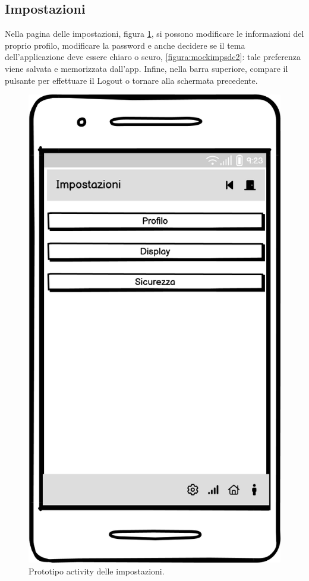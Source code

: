 \documentclass[a4paper,final,12pt]{report}
\begin{document}
\subsection{Impostazioni}
Nella pagina delle impostazioni, figura \ref{figura:mockimpsdc}, si possono modificare le informazioni del proprio profilo, modificare la password e anche decidere se il tema dell'applicazione deve essere chiaro o scuro, \ref{figura:mockimpsdc2}: tale preferenza viene salvata e memorizzata dall'app. Infine, nella barra superiore, compare il pulsante per effettuare il Logout o tornare alla schermata precedente.
\begin{figure}[hbtp]
\centering
\includegraphics[scale=0.28]{img_concettuale/Imp_mob.png}
\caption{Prototipo activity delle impostazioni.}
\label{figura:mockimpsdc}
\end{figure}
\end{document}
